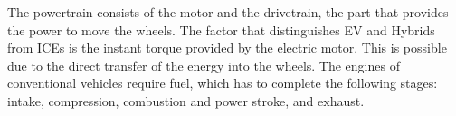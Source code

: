 The powertrain consists of the motor and the drivetrain, the part that provides the power to move the wheels. The factor that distinguishes EV and Hybrids from ICEs is the instant torque provided by the electric motor. This is possible due to the direct transfer of the energy into the wheels. The engines of conventional vehicles require fuel, which has to complete the following stages: intake, compression, combustion and power stroke, and exhaust.